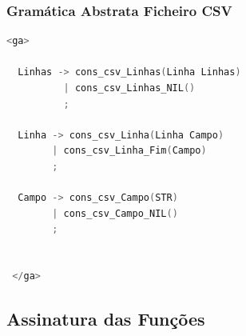 \documentclass[11pt, a4paper, oneside]{article}
\begin{document}
\subsubsection{Gramática Abstrata Ficheiro CSV}
\begin{lstlisting}[language=C++, caption={Gramática Abstrata do Ficheiro CSV}]
<ga>
  
  Linhas -> cons_csv_Linhas(Linha Linhas)
          | cons_csv_Linhas_NIL()
          ;

  Linha -> cons_csv_Linha(Linha Campo)
        | cons_csv_Linha_Fim(Campo)
        ;

  Campo -> cons_csv_Campo(STR)
        | cons_csv_Campo_NIL()
        ;


 </ga>

\end{lstlisting}

\subsection{Assinatura das Funções}

\newpage
\end{document}
